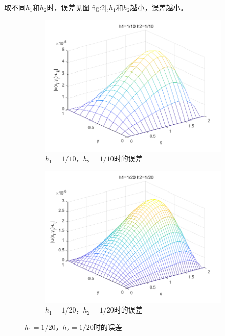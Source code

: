 \documentclass[withoutpreface,bwprint]{cumcmthesis} %
\begin{document}
	
	
	取不同$h_{1}$和$h_{2}$时，误差见图\ref{fig:2},$h_{1}$和$h_{2}$越小，误差越小。
	
	 \begin{figure}
		\centering
		\begin{subfigure}[b]{0.48\textwidth}
			\centering
			\includegraphics[width=\textwidth]{figures/f1}
			\caption[Network2]%
			{{\small $h_{1}=1/10$，$h_{2}=1/10$时的误差}}    
			\label{fig:mean and std of net14}
		\end{subfigure}
		\hfill
		\begin{subfigure}[b]{0.48\textwidth}  
			\centering 
			\includegraphics[width=\textwidth]{figures/f2}
			\caption[]%
			{{\small $h_{1}=1/20$，$h_{2}=1/20$时的误差}}    

\end{subfigure}
\end{figure}
\end{document}
